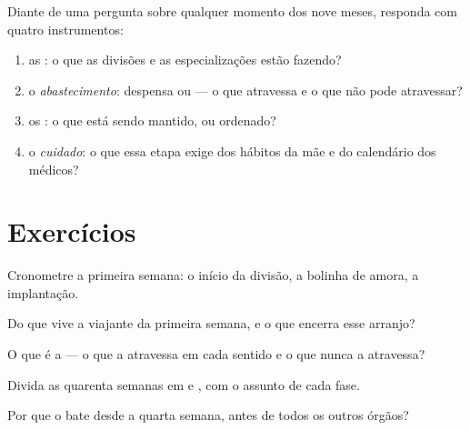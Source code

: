 \begin{method}\label{met:g8:from-egg-to-birth:explain}
Diante de uma pergunta sobre qualquer momento dos nove meses, responda
com quatro instrumentos:
\begin{enumerate}
  \item as \emph{}: o que as divisões e as especializações
        estão fazendo?
  \item o \emph{abastecimento}: despensa ou  --- o que
        atravessa e o que não pode atravessar?
  \item os \emph{}: o que está sendo mantido, ou ordenado?
  \item o \emph{cuidado}: o que essa etapa exige dos hábitos da mãe e
        do calendário dos médicos?
\end{enumerate}
\end{method}

\section{Exercícios}

\begin{exercise}[$\star$]\label{exo:g8:from-egg-to-birth:1}
Cronometre a primeira semana: o início da divisão, a bolinha de
amora, a implantação.
\end{exercise}

\begin{exercise}[$\star$]\label{exo:g8:from-egg-to-birth:2}
Do que vive a viajante da primeira semana, e o que encerra esse
arranjo?
\end{exercise}

\begin{exercise}[$\star$]\label{exo:g8:from-egg-to-birth:3}
O que é a  --- o que a atravessa em cada sentido e o que nunca
a atravessa?
\end{exercise}

\begin{exercise}[$\star$]\label{exo:g8:from-egg-to-birth:4}
Divida as quarenta semanas em  e , com o assunto de cada
fase.
\end{exercise}

\begin{exercise}[$\star$]\label{exo:g8:from-egg-to-birth:5}
Por que o  bate desde a quarta semana, antes de todos os outros
órgãos?
\end{exercise}

